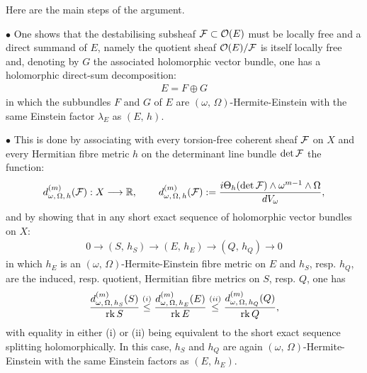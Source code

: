 \documentclass[12pt]{article}
\begin{document}
\vspace{1ex}

Here are the main steps of the argument.

\vspace{1ex}

$\bullet$ One shows that the destabilising subsheaf ${\cal F}\subset{\cal O}(E)$ must be locally free and a direct summand of $E$, namely the quotient sheaf ${\cal O}(E)/{\cal F}$ is itself locally free and, denoting by $G$ the associated holomorphic vector bundle, one has a holomorphic direct-sum decomposition: \begin{eqnarray*}E = F\oplus G\end{eqnarray*} in which the subbundles $F$ and $G$ of $E$ are $(\omega,\,\Omega)$-Hermite-Einstein with the same Einstein factor $\lambda_E$ as $(E,\,h)$.

  $\bullet$ This is done by associating with every torsion-free coherent sheaf ${\cal F}$ on $X$ and every Hermitian fibre metric $h$ on the determinant line bundle $\det{\cal F}$ the function: \begin{eqnarray*}d^{(m)}_{\omega,\,\Omega,\,h}({\cal F}):X\longrightarrow\mathbb{R}, \hspace{5ex}  d^{(m)}_{\omega,\,\Omega,\,h}({\cal F}):=\frac{i\Theta_h(\det{\cal F})\wedge\omega^{m-1}\wedge\Omega}{dV_\omega},\end{eqnarray*} and by showing that in any short exact sequence of holomorphic vector bundles on $X$: \begin{eqnarray*}0\longrightarrow (S,\,h_S) \longrightarrow (E,\,h_E) \longrightarrow (Q,\,h_Q)\longrightarrow 0\end{eqnarray*} in which $h_E$ is an $(\omega,\,\Omega)$-Hermite-Einstein fibre metric on $E$ and $h_S$, resp. $h_Q$, are the induced, resp. quotient, Hermitian fibre metrics on $S$, resp. $Q$, one has \begin{eqnarray*}\frac{d^{(m)}_{\omega,\,\Omega,\,h_S}(S)}{\operatorname{rk} S}\stackrel{(i)}{\leq} \frac{d^{(m)}_{\omega,\,\Omega,\,h_E}(E)}{\operatorname{rk} E}\stackrel{(ii)}{\leq} \frac{d^{(m)}_{\omega,\,\Omega,\,h_Q}(Q)}{\operatorname{rk} Q},\end{eqnarray*} with equality in either (i) or (ii) being equivalent to the short exact sequence splitting holomorphically. In this case, $h_S$ and $h_Q$ are again $(\omega,\,\Omega)$-Hermite-Einstein with the same Einstein factors as $(E,\,h_E)$.
\end{document}
